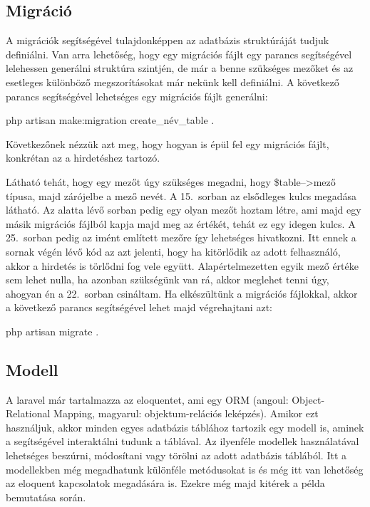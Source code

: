 \documentclass[]{thesis-ekf}
\theoremstyle{definition}
\theoremstyle{remark}
\begin{document}
	\subsection{Migráció}
		A migrációk segítségével tulajdonképpen az adatbázis struktúráját tudjuk definiálni. Van arra lehetőség, hogy egy migrációs fájlt egy parancs segítségével lelehessen generálni struktúra szintjén, de már a benne szükséges mezőket és az esetleges különböző megszorításokat már nekünk kell definiálni. A következő parancs segítségével lehetséges egy migrációs fájlt generálni:
		\begin{center} 
			php artisan make:migration create\_név\_table .
		\end{center}
		Következőnek nézzük azt meg, hogy hogyan is épül fel egy migrációs fájlt, konkrétan az a hirdetéshez tartozó.
	
		
		
		Látható tehát, hogy egy mezőt úgy szükséges megadni, hogy \$table-->mező típusa, majd zárójelbe a mező nevét.
		A 15.~sorban az elsődleges kulcs megadása látható. Az alatta lévő sorban pedig egy olyan mezőt hoztam létre, ami majd egy másik migrációs fájlból kapja majd meg az értékét, tehát ez egy idegen kulcs. A 25.~sorban pedig az imént említett mezőre így lehetséges hivatkozni. Itt ennek a sornak végén lévő kód az azt jelenti, hogy ha kitörlődik az adott felhasználó, akkor a hirdetés is törlődni fog vele együtt. Alapértelmezetten egyik mező értéke sem lehet nulla, ha azonban szükségünk van rá, akkor meglehet tenni úgy, ahogyan én a 22.~sorban csináltam. Ha elkészültünk a migrációs fájlokkal, akkor a következő parancs segítségével lehet majd végrehajtani azt:
		\begin{center}
			php artisan migrate .
		\end{center}
	\subsection{Modell}
		A laravel már tartalmazza az eloquentet, ami egy ORM (angoul: Object-Relational Mapping, magyarul: objektum-relációs leképzés). Amikor ezt használjuk, akkor minden egyes adatbázis táblához tartozik egy modell is, aminek a segítségével interaktálni tudunk a táblával. Az ilyenféle modellek használatával lehetséges beszúrni, módosítani vagy törölni az adott adatbázis táblából. Itt a modellekben még megadhatunk különféle metódusokat is és még itt van lehetőség az eloquent kapcsolatok megadására is. Ezekre még majd kitérek a példa bemutatása során.\cite{Laravel}
		
\end{document}
